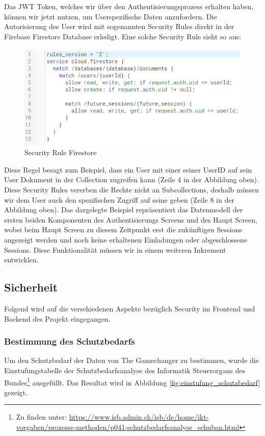 Das JWT Token, welches wir über den Authentisierungsprozess erhalten haben, können wir jetzt nutzen, um Userspezifische Daten anzufordern. Die Autorisierung des User wird mit sogenannten Security Rules direkt in der Firebase Firestore Database erledigt. Eine solche Security Rule sieht so aus:

\begin{figure}[H]
    \centering
    \includegraphics[width=\textwidth]{images/security_rule.PNG}
    \caption{Security Rule Firestore}
    \label{fig:security_rule}
\end{figure}


Diese Regel besagt zum Beispiel, dass ein User mit einer seiner UserID auf sein User Dokument in der Collection  zugreifen kann (Zeile 4 in der Abbildung oben). Diese Security Rules vererben die Rechte nicht an Subcollections, deshalb müssen wir dem User auch den spezifischen Zugriff auf seine  geben (Zeile 8 in der Abbildung oben).
\newline
Das dargelegte Beispiel repräsentiert das Datenmodell der ersten beiden Komponenten des Authentisierungs Screens und des Haupt Screen, wobei beim Haupt Screen zu diesem Zeitpunkt erst die zukünftigen Sessions angezeigt werden und noch keine erhaltenen Einladungen oder abgeschlossene Sessions. Diese Funktionalität müssen wir in einem weiteren Inkrement entwicklen. 


\subsection{Sicherheit}
Folgend wird auf die verschiedenen Aspekte bezüglich Security im Frontend und Backend des Projekt eingegangen.

\subsubsection{Bestimmung des Schutzbedarfs}
Um den Schutzbedarf der Daten von The Gamechanger zu bestimmen, wurde die Einstufungstabelle der Schutzbedarfsanalyse des Informatik Steuerorgans des Bundes\footnote{Zu finden unter: \url{https://www.isb.admin.ch/isb/de/home/ikt-vorgaben/prozesse-methoden/p041-schutzbedarfsanalyse_schuban.html}} ausgefüllt. Das Resultat wird in Abbildung \ref{fig:einstufung_schutzbedarf} gezeigt. 

